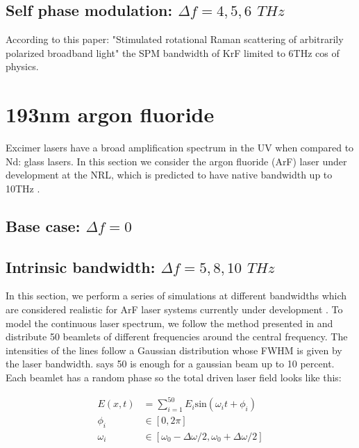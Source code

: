 \subsection{Self phase modulation: $\Delta f=4,5,6$ $\si{THz}$}

According to this paper: "Stimulated rotational Raman scattering of arbitrarily polarized broadband light" \citep{Lehmberg2020} the SPM bandwidth of KrF limited to 6THz cos of physics.

\section{193nm argon fluoride}\label{sec:193}
Excimer lasers have a broad amplification spectrum in the UV when compared to Nd: glass lasers. In this section we consider the argon fluoride (ArF) laser under development at the NRL, which is predicted to have native bandwidth up to 10THz \citep{Obenschain2020}.

\subsection{Base case: $\Delta f=0$}



\subsection{Intrinsic bandwidth: $\Delta f =5,8,10$ $\si{THz}$}
In this section, we perform a series of simulations at different bandwidths which are considered realistic for ArF laser systems currently under development \citep{Obenschain2020}. To model the continuous laser spectrum, we follow the method presented in \citet{Bates2020} and distribute 50 beamlets of different frequencies around the central frequency. The intensities of the lines follow a Gaussian distribution whose FWHM is given by the laser bandwidth. \citet{Follett2019} says 50 is enough for a gaussian beam up to 10 percent. Each beamlet has a random phase so the total driven laser field looks like this:



\begin{equation}
\begin{aligned}
	E(x,t) &= \sum_{i=1}^{50} E_i \mathrm{sin}(\omega_i t + \phi_i) \\
	\phi_i & \in  [0,2\pi] \\
	\omega_i & \in [\omega_0 - \Delta\omega / 2, \omega_0 + \Delta\omega / 2]
\end{aligned}
\end{equation}

